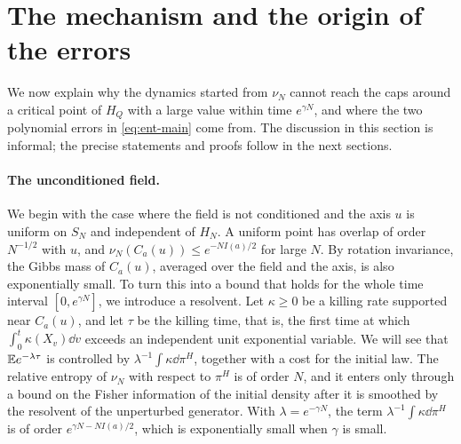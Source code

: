 \section{The mechanism and the origin of the errors}
\label{sec:ent-mechanism}

We now explain why the dynamics started from $\nu_N$ cannot reach the caps
around a critical point of $H_Q$ with a large value within time
$e^{\gamma N}$, and where the two
polynomial errors in \eqref{eq:ent-main} come from. The discussion in this
section is informal; the precise statements and proofs follow in the next
sections.

\paragraph{The unconditioned field.}
We begin with the case where the field is not conditioned and the axis $u$
is uniform on $S_N$ and independent of $H_N$. A uniform point has overlap of
order $N^{-1/2}$ with $u$, and $\nu_N(C_a(u))\le e^{-NI(a)/2}$ for
large $N$. By rotation invariance, the Gibbs mass of $C_a(u)$, averaged over
the field and the axis, is also exponentially small. To turn this into a
bound that holds for the whole time interval $[0,e^{\gamma N}]$, we introduce
a resolvent. Let $\kappa\ge0$ be a killing rate supported near $C_a(u)$, and
let $\tau$ be the killing time, that is, the first time at which
$\int_0^t\kappa(X_v)\dd v$ exceeds an independent unit exponential variable.
We will see that $\mathbb E e^{-\lambda\tau}$ is
controlled by $\lambda^{-1}\int\kappa\dd\pi^H$, together with a cost for the
initial law. The relative entropy of $\nu_N$ with respect to $\pi^H$ is of
order $N$, and it enters only through a bound on the Fisher information of
the initial density after it is smoothed by the resolvent of the unperturbed
generator. With $\lambda=e^{-\gamma N}$, the term $\lambda^{-1}\int\kappa\dd\pi^H$
is of order
$e^{\gamma N-NI(a)/2}$, which is exponentially small when $\gamma$ is small.

